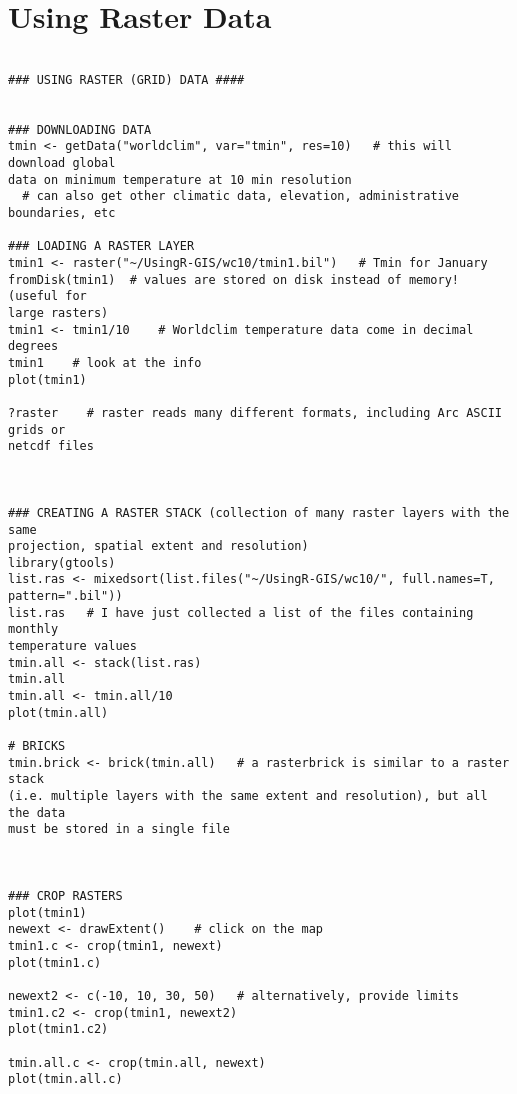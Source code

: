 \section{Using Raster Data} 
\begin{verbatim}
 
### USING RASTER (GRID) DATA ####
 
 
### DOWNLOADING DATA
tmin <- getData("worldclim", var="tmin", res=10)   # this will download global
data on minimum temperature at 10 min resolution
  # can also get other climatic data, elevation, administrative boundaries, etc
 
### LOADING A RASTER LAYER
tmin1 <- raster("~/UsingR-GIS/wc10/tmin1.bil")   # Tmin for January
fromDisk(tmin1)  # values are stored on disk instead of memory! (useful for
large rasters)
tmin1 <- tmin1/10    # Worldclim temperature data come in decimal degrees
tmin1    # look at the info
plot(tmin1)
 
?raster    # raster reads many different formats, including Arc ASCII grids or
netcdf files
 
 
 
### CREATING A RASTER STACK (collection of many raster layers with the same
projection, spatial extent and resolution)
library(gtools)
list.ras <- mixedsort(list.files("~/UsingR-GIS/wc10/", full.names=T,
pattern=".bil"))
list.ras   # I have just collected a list of the files containing monthly
temperature values
tmin.all <- stack(list.ras)
tmin.all
tmin.all <- tmin.all/10
plot(tmin.all)
 
# BRICKS
tmin.brick <- brick(tmin.all)   # a rasterbrick is similar to a raster stack
(i.e. multiple layers with the same extent and resolution), but all the data
must be stored in a single file
 
 
 
### CROP RASTERS
plot(tmin1)
newext <- drawExtent()    # click on the map
tmin1.c <- crop(tmin1, newext)
plot(tmin1.c)
 
newext2 <- c(-10, 10, 30, 50)   # alternatively, provide limits
tmin1.c2 <- crop(tmin1, newext2)
plot(tmin1.c2)
 
tmin.all.c <- crop(tmin.all, newext)
plot(tmin.all.c)
 
\end{verbatim}


